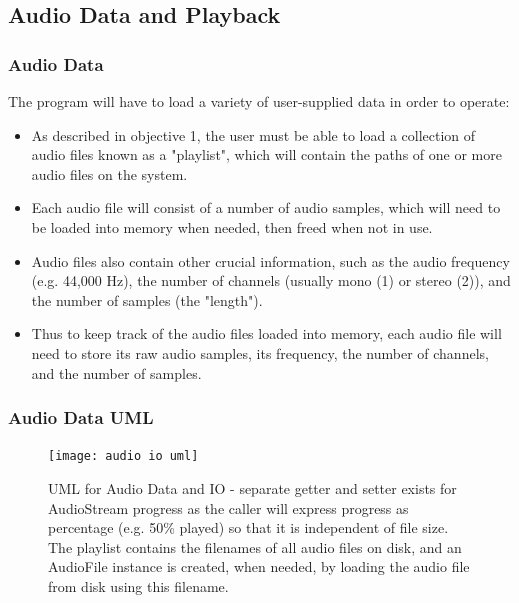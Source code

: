 \pagebreak

\subsection{Audio Data and Playback}

\subsubsection{Audio Data}
The program will have to load a variety of  user-supplied data in order to operate:
\begin{itemize}
	\item As described in objective 1, the user must be able to load a collection of audio files known as  a "playlist", which will contain the paths of one or more audio files on the system.
	\item Each audio file will consist of a number of audio samples, which will need to be loaded into memory when needed, then freed when not in use.
	\item Audio files also contain other crucial information, such as the audio frequency (e.g. 44,000 Hz), the number of channels (usually mono (1) or stereo (2)), and the number of samples (the "length").
	\item Thus to keep track of the audio files loaded into memory, each audio file will need to store its raw audio samples, its frequency, the number of channels, and the number of samples.
\end{itemize}

\subsubsection{ Audio Data UML }
\begin{figure}[H]
	\texttt{[image: audio io uml]}
	\caption{UML for Audio Data and IO - separate getter and setter exists for AudioStream progress as the caller will express progress as percentage (e.g. 50\% played) so that it is independent of file size. The playlist contains the filenames of all audio files on disk, and an AudioFile instance is created, when needed, by loading the audio file from disk using this filename. }
\end{figure}

